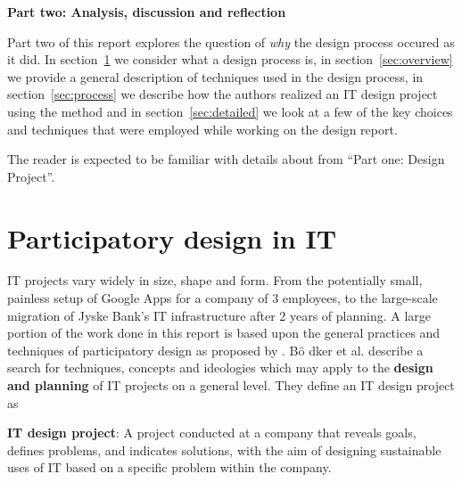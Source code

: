 \setcounter{section}{0}
\setcounter{figure}{0}
\setcounter{table}{0}
\newpage
\textbf{\LARGE{{Part two: Analysis, discussion and reflection}}}\\


Part two of this report explores the question of \textit{why}
the design process occured as it did. In section~\ref{sec:participatory}
we consider what a design process is, in section~\ref{sec:overview}
we provide a general description of techniques used in the design process,
in section~\ref{sec:process} we describe how the authors realized an IT design
project using the \must{} method and in section~\ref{sec:detailed} we
look at a few of the key choices and techniques that were employed while working
on the design report.

The reader is expected to be familiar with details about \gomonkey{} 
from ``Part one: Design Project''.

\section{Participatory design in IT} \label{sec:participatory}

IT projects vary widely in size, shape and form. From the potentially small, painless 
setup of Google Apps for a company of 3 employees, to the large-scale migration of
Jyske Bank's IT infrastructure after 2 years of planning\cite{jyskebank}.
A large portion of the work done in this report is based upon the general
practices and techniques of participatory design as proposed by \cite{bodker2004participatory}.
B\"o dker et al. describe a search for techniques, concepts and ideologies which may apply
to the \textbf{design and planning} of IT projects on a general level. They
define an IT design project as
\begin{figure*}[h!]
    \centering
    \textbf{IT design project}: A project conducted at a company that reveals
    goals, defines problems, and indicates solutions, with the aim of designing
    sustainable uses of IT based on a specific problem within the company.
\end{figure*}

